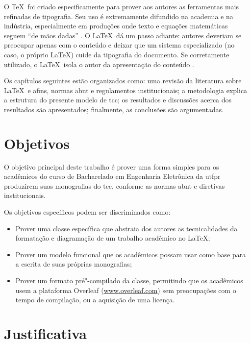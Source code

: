 O \TeX\ foi criado especificamente para prover aos autores as ferramentas mais refinadas de tipografia. Seu uso é extremamente difundido na academia e na indústria, especialmente em produções onde texto e equações matemáticas seguem \enquote{de mãos dadas} \cite{Knuth1986a}. O \LaTeX\ dá um passo adiante: autores deveriam se preocupar apenas com o conteúdo e deixar que um sistema especializado (no caso, o próprio \LaTeX) cuide da tipografia do documento. Se corretamente utilizado, o \LaTeX\ isola o autor da apresentação do conteúdo \cite{Lamport1994}.

Os capítulos seguintes estão organizados como: uma revisão da literatura sobre \LaTeX\ e afins, normas \ac{abnt} e regulamentos institucionais; a metodologia explica a estrutura do presente modelo de \ac{tcc}; os resultados e discussões acerca dos resultados são apresentados; finalmente, as conclusões são argumentadas.

\section{Objetivos}

O objetivo principal deste trabalho é prover uma forma simples para os acadêmicos do curso de Bacharelado em Engenharia Eletrônica da \ac{utfpr} produzirem suas monografias do \ac{tcc}, conforme as normas \ac{abnt} e diretivas institucionais.

Os objetivos específicos podem ser discriminados como:
\begin{itemize}
	\item Prover uma classe específica que abstraia dos autores as tecnicalidades da formatação e diagramação de um trabalho acadêmico no \LaTeX;
	\item Prover um modelo funcional que os acadêmicos possam usar como base para a escrita de suas próprias monografias;
	\item Prover um formato pré"-compilado da classe, permitindo que os acadêmicos usem a plataforma Overleaf (\url{www.overleaf.com}) sem preocupações com o tempo de compilação, ou a aquisição de uma licença.
\end{itemize}

\section{Justificativa}

